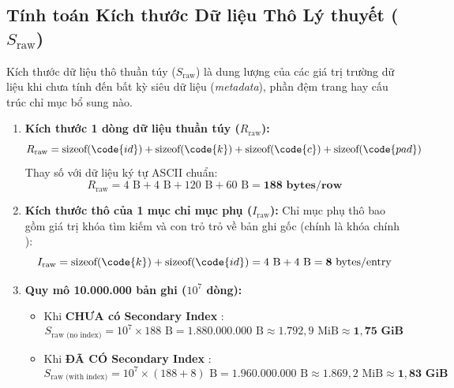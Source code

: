 \subsection{Tính toán Kích thước Dữ liệu Thô Lý thuyết ($S_{\text{raw}}$)}

Kích thước dữ liệu thô thuần túy ($S_{\text{raw}}$) là dung lượng của các giá trị trường dữ liệu khi chưa tính đến bất kỳ siêu dữ liệu (\textit{metadata}), phần đệm trang hay cấu trúc chỉ mục bổ sung nào.

\begin{enumerate}
  \item \textbf{Kích thước 1 dòng dữ liệu thuần túy ($R_{\text{raw}}$):}
  \begin{equation}
    R_{\text{raw}} = \text{sizeof}(\code{id}) + \text{sizeof}(\code{k}) + \text{sizeof}(\code{c}) + \text{sizeof}(\code{pad})
  \end{equation}
  Thay số với dữ liệu ký tự ASCII chuẩn:
  \begin{equation}
    R_{\text{raw}} = 4\text{ B} + 4\text{ B} + 120\text{ B} + 60\text{ B} = \mathbf{188\text{ bytes/row}}
  \end{equation}

  \item \textbf{Kích thước thô của 1 mục chỉ mục phụ  ($I_{\text{raw}}$):}
  Chỉ mục phụ thô bao gồm giá trị khóa tìm kiếm  và con trỏ trỏ về bản ghi gốc (chính là khóa chính ):
  \begin{equation}
    I_{\text{raw}} = \text{sizeof}(\code{k}) + \text{sizeof}(\code{id}) = 4\text{ B} + 4\text{ B} = \mathbf{8\text{ bytes/entry}}
  \end{equation}

  \item \textbf{Quy mô 10.000.000 bản ghi ($10^7$ dòng):}
  \begin{itemize}
    \item Khi \textbf{CHƯA có Secondary Index }:
    \begin{equation}
      S_{\text{raw (no index)}} = 10^7 \times 188\text{ B} = 1.880.000.000\text{ B} \approx 1.792,9\text{ MiB} \approx \mathbf{1,75\text{ GiB}}
    \end{equation}
    \item Khi \textbf{ĐÃ CÓ Secondary Index }:
    \begin{equation}
      S_{\text{raw (with index)}} = 10^7 \times (188 + 8)\text{ B} = 1.960.000.000\text{ B} \approx 1.869,2\text{ MiB} \approx \mathbf{1,83\text{ GiB}}
    \end{equation}
  \end{itemize}


\end{enumerate}
